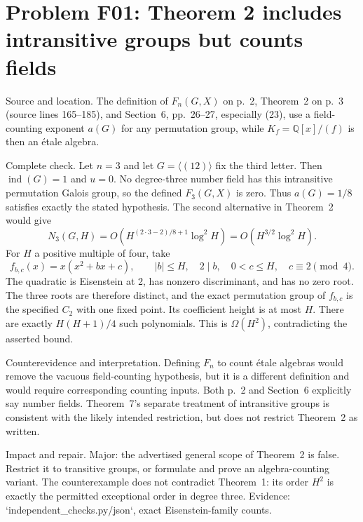 \documentclass[10pt]{article}
\begin{document}
\section*{Problem F01: Theorem 2 includes intransitive groups but counts fields}
Source and location. The definition of \(F_n(G,X)\) on p. 2, Theorem 2 on p. 3 (source lines 165–185), and Section 6, pp. 26–27, especially (23), use a field-counting exponent \(a(G)\) for any permutation group, while \(K_f=\mathbb Q[x]/(f)\) is then an étale algebra.\par
Complete check. Let \(n=3\) and let \(G=\langle(12)\rangle\) fix the third letter. Then \(\operatorname{ind}(G)=1\) and \(u=0\). No degree-three number field has this intransitive permutation Galois group, so the defined \(F_3(G,X)\) is zero. Thus \(a(G)=1/8\) satisfies exactly the stated hypothesis. The second alternative in Theorem 2 would give \[N_3(G,H)=O(H^{(2\cdot3-2)/8+1}\log^2H)
          =O(H^{3/2}\log^2H).\] For \(H\) a positive multiple of four, take \[f_{b,c}(x)=x(x^2+bx+c),\qquad |b|\le H,\quad 2\mid b,
 \quad 0<c\le H,\quad c\equiv2\pmod4.\] The quadratic is Eisenstein at 2, has nonzero discriminant, and has no zero root. The three roots are therefore distinct, and the exact permutation group of \(f_{b,c}\) is the specified \(C_2\) with one fixed point. Its coefficient height is at most \(H\). There are exactly \(H(H+1)/4\) such polynomials. This is \(\Omega(H^2)\), contradicting the asserted bound.\par
Counterevidence and interpretation. Defining \(F_n\) to count étale algebras would remove the vacuous field-counting hypothesis, but it is a different definition and would require corresponding counting inputs. Both p. 2 and Section 6 explicitly say number fields. Theorem 7’s separate treatment of intransitive groups is consistent with the likely intended restriction, but does not restrict Theorem 2 as written.\par
Impact and repair. Major: the advertised general scope of Theorem 2 is false. Restrict it to transitive groups, or formulate and prove an algebra-counting variant. The counterexample does not contradict Theorem 1: its order \(H^2\) is exactly the permitted exceptional order in degree three. Evidence: `independent\_checks.py/json`, exact Eisenstein-family counts.\par
\end{document}
